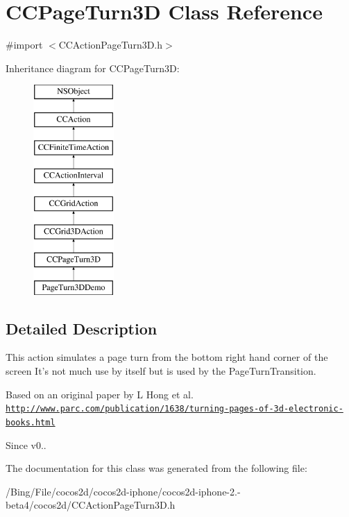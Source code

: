 \hypertarget{interface_c_c_page_turn3_d}{\section{C\-C\-Page\-Turn3\-D Class Reference}
\label{interface_c_c_page_turn3_d}
}


{\ttfamily \#import $<$C\-C\-Action\-Page\-Turn3\-D.\-h$>$}

Inheritance diagram for C\-C\-Page\-Turn3\-D\-:\begin{figure}[H]
\begin{center}
\leavevmode
\includegraphics[height=8.000000cm]{interface_c_c_page_turn3_d}
\end{center}
\end{figure}


\subsection{Detailed Description}
This action simulates a page turn from the bottom right hand corner of the screen It's not much use by itself but is used by the Page\-Turn\-Transition.

Based on an original paper by L Hong et al. \href{http://www.parc.com/publication/1638/turning-pages-of-3d-electronic-books.html}{\tt http\-://www.\-parc.\-com/publication/1638/turning-\/pages-\/of-\/3d-\/electronic-\/books.\-html}

\begin{DoxySince}{Since}
v0.. 
\end{DoxySince}


The documentation for this class was generated from the following file\-:\begin{DoxyCompactItemize}
\item 
/\-Bing/\-File/cocos2d/cocos2d-\/iphone/cocos2d-\/iphone-\/2.-\/beta4/cocos2d/C\-C\-Action\-Page\-Turn3\-D.\-h\end{DoxyCompactItemize}
